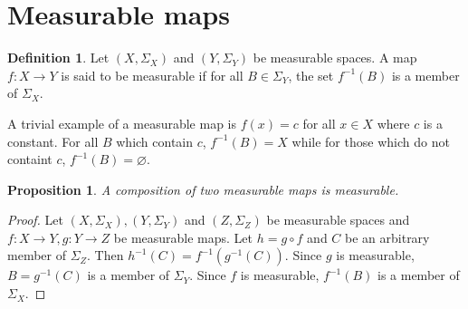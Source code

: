 \documentclass{article}
\theoremstyle{plain}
\numberwithin{thm}{section}
\theoremstyle{plain}
\newtheorem{prop}{Proposition}
\numberwithin{prop}{section}
\theoremstyle{definition}
\newtheorem{defn}{Definition}
\numberwithin{defn}{section}
\theoremstyle{remark}
\numberwithin{equation}{section}
\begin{document}
\section{Measurable maps}\label{s2}
\begin{defn}\label{s2d1}
Let $(X, \Sigma_X)$ and $(Y, \Sigma_Y)$ be measurable spaces. A map $f: X
\rightarrow Y$ is said to be measurable if for all $B \in \Sigma_Y$, the set
$f^{-1}(B)$ is a member of $\Sigma_X$.
\end{defn}

A trivial example of a measurable map is $f(x) = c$ for all $x \in X$ where $c$
is a constant. For all $B$ which contain $c$, $f^{-1}(B) = X$ while for those 
which do not containt $c$, $f^{-1}(B) = \varnothing$.

\begin{prop}\label{s2p1}
A composition of two measurable maps is measurable.
\end{prop}
\begin{proof}
Let $(X, \Sigma_X), (Y, \Sigma_Y)$ and $(Z, \Sigma_Z)$ be measurable spaces and
$f:X \rightarrow Y, g: Y \rightarrow Z$ be measurable maps. Let $h = g \circ f$
and $C$ be an arbitrary member of $\Sigma_Z$. Then $h^{-1}(C) = f^{-1}(g^{-1}(C))$.
Since $g$ is measurable, $B = g^{-1}(C)$ is a member of $\Sigma_Y$. Since $f$ is
measurable, $f^{-1}(B)$ is a member of $\Sigma_X$.
\end{proof}
\end{document}
